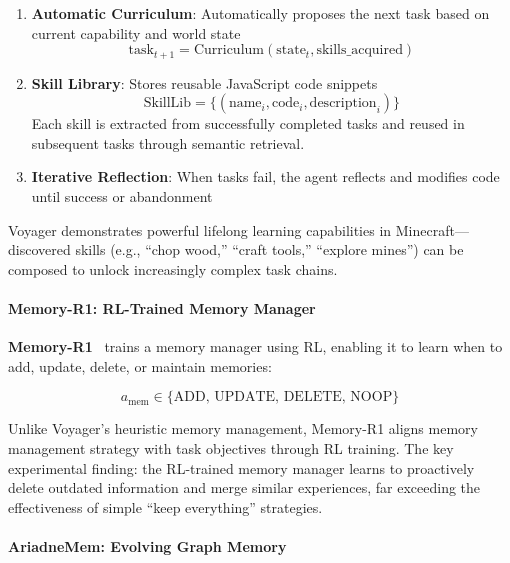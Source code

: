 \begin{enumerate}
\item \textbf{Automatic Curriculum}: Automatically proposes the next task based on current capability and world state
\begin{equation}
\text{task}_{t+1} = \text{Curriculum}(\text{state}_t, \text{skills\_acquired})
\label{eq:voyager-curriculum}
\end{equation}

\item \textbf{Skill Library}: Stores reusable JavaScript code snippets
\begin{equation}
\text{SkillLib} = \{(\text{name}_i, \text{code}_i, \text{description}_i)\}
\label{eq:voyager-skills}
\end{equation}
Each skill is extracted from successfully completed tasks and reused in subsequent tasks through semantic retrieval.

\item \textbf{Iterative Reflection}: When tasks fail, the agent reflects and modifies code until success or abandonment
\end{enumerate}

Voyager demonstrates powerful lifelong learning capabilities in Minecraft---discovered skills (e.g., ``chop wood,'' ``craft tools,'' ``explore mines'') can be composed to unlock increasingly complex task chains.

\paragraph{Memory-R1: RL-Trained Memory Manager}

\textbf{Memory-R1}~\citep{memoryr1_2025} trains a memory manager using RL, enabling it to learn when to add, update, delete, or maintain memories:

\begin{equation}
a_{\mathrm{mem}} \in \{\text{ADD, UPDATE, DELETE, NOOP}\}
\label{eq:memr1-actions}
\end{equation}

Unlike Voyager's heuristic memory management, Memory-R1 aligns memory management strategy with task objectives through RL training. The key experimental finding: the RL-trained memory manager learns to proactively delete outdated information and merge similar experiences, far exceeding the effectiveness of simple ``keep everything'' strategies.

\paragraph{AriadneMem: Evolving Graph Memory}

